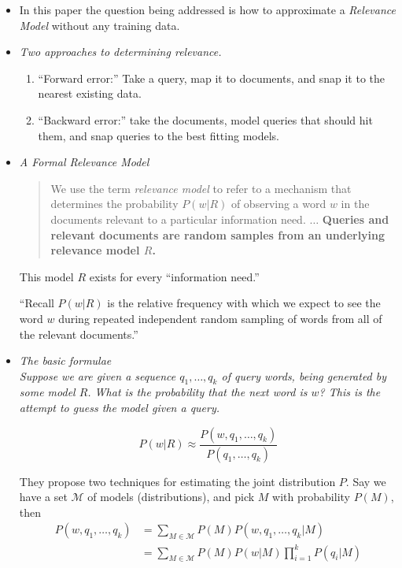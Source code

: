 \documentclass{article}
\newcommand{\note}[1]{{\footnotesize #1}}
\newcommand{\hii}[1]{{\it #1}}
\newcommand{\hiii}[1]{{\it #1}}
\newcommand{\M}{\mathcal{M}}
\begin{document}
\begin{itemize}

\item In this paper the question being addressed is how to approximate a \emph{Relevance Model} without any training data.

\item \hii{Two approaches to determining relevance.}
    \begin{enumerate}
        \item ``Forward error:''  Take a query, map it to documents, and snap it to the nearest existing data.
        \item ``Backward error:'' take the documents, model queries that should hit them, and snap queries to the best fitting models.
    \end{enumerate}

\item \hii{A Formal Relevance Model}
        \begin{quote}
            We use the term \emph{relevance model} to refer to a mechanism that determines the probability $P(w|R)$ of observing a word $w$ in the documents relevant to a particular information need. $\dots$ {\bf Queries and relevant documents are random samples from an underlying relevance model $R$.}
        \end{quote}

        \note{This model $R$ exists for every ``information need.''}

        \note{ ``Recall $P(w|R)$ is the relative frequency with which we expect to see the word $w$ during repeated independent random sampling of words from all of the relevant documents.''}

\item \hii{The basic formulae}\\
    \hiii{Suppose we are given a sequence $q_1, \dots, q_k$ of query words, being generated by some model $R$.  What is the probability that the next word is $w$?  This is the attempt to guess the model given a query.}

    \[ P(w|R) \approx \frac{P(w,q_1,\dots,q_k)}{P(q_1,\dots,q_k)} \]
    
    They propose two techniques for estimating the joint distribution $P$.  Say we have a set $\M$ of models (distributions), and pick $M$ with probability $P(M)$, then
    \begin{align*}
        P(w,q_1,\dots,q_k) 
           & =  \sum_{M \in \M} P(M)P(w,q_1,\dots,q_k|M) \\
           & =  \sum_{M \in \M} P(M)P(w|M)\prod_{i=1}^k P(q_i|M)
    \end{align*}
    

\end{itemize}
\end{document}
